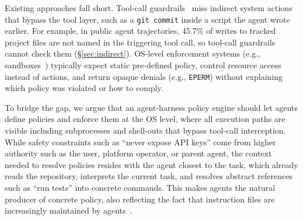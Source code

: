 Existing approaches fall short.
Tool-call guardrails~\cite{xiang2025guardagent,wang2025agentspec,shi2025progent,costa2025fides,debenedetti2025camel} miss indirect system actions that bypass the tool layer, such as a \texttt{git~commit} inside a script the agent wrote earlier.
For example, in public agent trajectories, 45.7\% of writes to tracked project files are not named in the triggering tool call, so tool-call guardrails cannot check them (\S\ref{sec:indirect}).
OS-level enforcement systems (e.g., sandboxes~\cite{seccomp-bpf,apparmor,landlock,ciliumtetragon,gvisor}) typically expect static pre-defined policy, control resource access instead of actions, and return opaque denials (e.g., \texttt{EPERM}) without explaining which policy was violated or how to comply.

To bridge the gap, we argue that an agent-harness policy engine should let agents define policies and enforce them at the OS level, where all execution paths are visible including subprocesses and shell-outs that bypass tool-call interception.
While safety constraints such as ``never expose API keys'' come from higher authority such as the user, platform operator, or parent agent, the context needed to resolve policies resides with the agent closest to the task, which already reads the repository, interprets the current task, and resolves abstract references such as ``run tests'' into concrete commands.
This makes agents the natural producer of concrete policy, also reflecting the fact that instruction files are increasingly maintained by agents~\cite{anthropic2025claudecode,galster2026configuring}.


